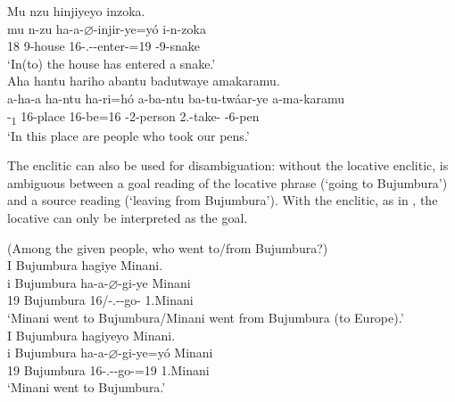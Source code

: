\documentclass[output=paper]{langscibook}
\begin{document}
\z

\ea
\label{bkm:Ref80456754}
Mu nzu hinjiyeyo inzoka.\\
\gll
mu  n-zu  ha-a-$\varnothing$-injir-ye=yó  i-n-zoka\\
18  9-house  16\SM{}-\N.\PST-\CJ{}-enter-\PFV{}=19  \AUG{}-9-snake\\
\glt
‘In(to) the house has entered a snake.’\\

\ex
\label{bkm:Ref80456783}
Aha hantu hariho abantu badutwaye amakaramu.\\
\gll
a-ha-a  ha-ntu  ha-ri=hó a-ba-ntu  ba-tu-twáar-ye  a-ma-karamu\\
-\DEM{}\textsubscript{1}  16-place  16\SM{}-be=16  \AUG{}-2-person  2\PL.\OM{}-take-\PFV{}  \AUG{}-6-pen\\
\glt
‘In this place are people who took our pens.’\\

\z

The enclitic can also be used for disambiguation: without the locative enclitic,  is ambiguous between a goal reading of the locative phrase (‘going to Bujumbura’) and a source reading (‘leaving from Bujumbura’). With the enclitic, as in , the locative can only be interpreted as the goal.

\ea
\label{bkm:Ref80278403}
(Among the given people, who went to/from Bujumbura?)\\
I Bujumbura hagiye Minani.\\
\gll
i  Bujumbura  ha-a-$\varnothing$-gi-ye  Minani\\
19  Bujumbura  16\SM/\EXP-\N.\PST-\CJ{}-go-\PFV{}  1.Minani\\
\glt
‘Minani went to Bujumbura/Minani went from Bujumbura (to Europe).’\\

\ex
\label{bkm:Ref80278372}
I Bujumbura hagiyeyo Minani.\\
\gll
i  Bujumbura  ha-a-$\varnothing$-gi-ye=yó  Minani\\
19  Bujumbura  16\SM-\N.\PST-\CJ{}-go-\PFV{}=19  1.Minani\\
\glt
‘Minani went to Bujumbura.’\\
\end{document}
